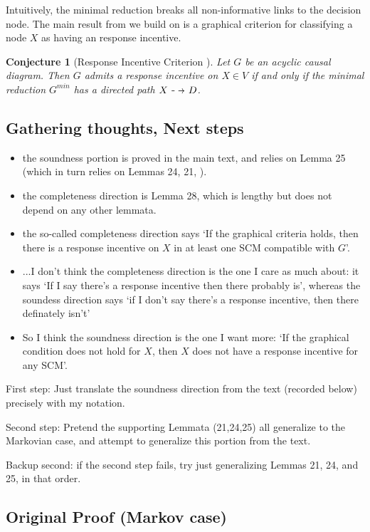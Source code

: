\documentclass[letterpaper,10pt]{article}
\newtheorem{conjecture}{Conjecture}
\newcommand\dashto{\mathrel{
  -\mkern-6mu{\to}\mkern-20mu{\color{white}\bullet}\mkern12mu
}}
\begin{document}
Intuitively, the minimal reduction breaks all non-informative links to the decision node.
The main result from \cite{everitt2021agent} we build on is a graphical criterion for classifying a node $X$ as having an response incentive.


\begin{conjecture}[Response Incentive Criterion \cite{everitt2021agent}]\label{nonmarkov}
Let $G$ be an acyclic causal diagram. Then $G$ admits a response incentive on $X\in V$ if and only if the minimal reduction $G^{min}$ has a directed path $X\dashto D$.
\end{conjecture}

\subsection{Gathering thoughts, Next steps}
\begin{itemize}
  \item the soundness portion is proved in the main text, and relies on Lemma 25 (which in turn relies on Lemmas 24, 21, ).
  \item the completeness direction is Lemma 28, which is lengthy but does not depend on any other lemmata.
  \item the so-called completeness direction says `If the graphical criteria holds, then there is a response incentive on $X$ in at least one SCM compatible with $G$'.
  \item ...I don't think the completeness direction is the one I care as much about: it says `If I say there's a response incentive then there probably is', whereas the soundess direction says `if I don't say there's a response incentive, then there definately isn't'
  \item So I think the soundness direction is the one I want more: `If the graphical condition does not hold for $X$, then $X$ does not have a response incentive for any SCM'.
\end{itemize}
First step: Just translate the soundness direction from the text (recorded below) precisely with my notation.

Second step: Pretend the supporting Lemmata (21,24,25) all generalize to the Markovian case, and attempt to generalize this portion from the text.

Backup second: if the second step fails, try just generalizing Lemmas 21, 24, and 25, in that order.

\subsection{Original Proof (Markov case)}
\end{document}
